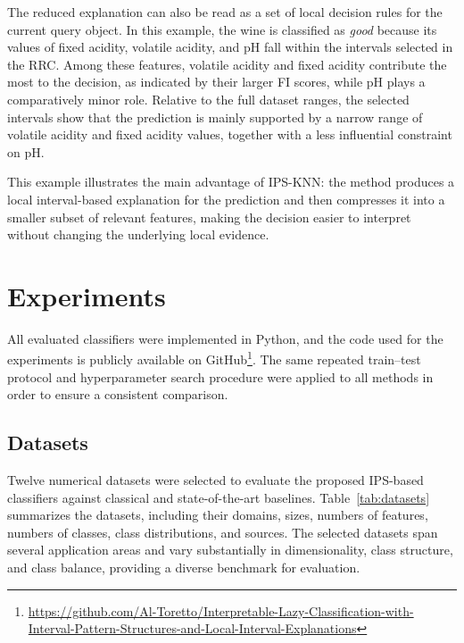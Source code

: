 \documentclass[a4paper,fleqn]{cas-sc}
\begin{document}
The reduced explanation can also be read as a set of local decision rules for the current query object. In this example, the wine is classified as \emph{good} because its values of fixed acidity, volatile acidity, and pH fall within the intervals selected in the RRC. Among these features, volatile acidity and fixed acidity contribute the most to the decision, as indicated by their larger FI scores, while pH plays a comparatively minor role. Relative to the full dataset ranges, the selected intervals show that the prediction is mainly supported by a narrow range of volatile acidity and fixed acidity values, together with a less influential constraint on pH.

This example illustrates the main advantage of IPS-KNN: the method produces a local interval-based explanation for the prediction and then compresses it into a smaller subset of relevant features, making the decision easier to interpret without changing the underlying local evidence.

\FloatBarrier
\section{Experiments}\label{section_experiments}
All evaluated classifiers were implemented in Python, and the code used for the experiments is publicly available on GitHub\footnote{\url{https://github.com/Al-Toretto/Interpretable-Lazy-Classification-with-Interval-Pattern-Structures-and-Local-Interval-Explanations}}. The same repeated train--test protocol and hyperparameter search procedure were applied to all methods in order to ensure a consistent comparison.

\subsection{Datasets}
Twelve numerical datasets were selected to evaluate the proposed IPS-based classifiers against classical and state-of-the-art baselines. Table~\ref{tab:datasets} summarizes the datasets, including their domains, sizes, numbers of features, numbers of classes, class distributions, and sources. The selected datasets span several application areas and vary substantially in dimensionality, class structure, and class balance, providing a diverse benchmark for evaluation.
\end{document}
